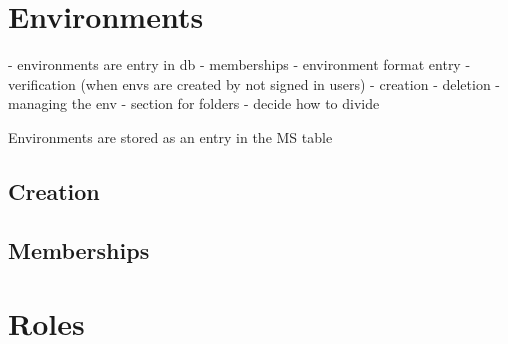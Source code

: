 \section{Environments}

- environments are entry in db
- memberships
- environment format entry
- verification (when envs are created by not signed in users)
- creation
- deletion - managing the env
- section for folders
- decide how to divide 

Environments are stored as an entry in the MS table


\subsection{Creation}
\subsection{Memberships}

\section{Roles}


